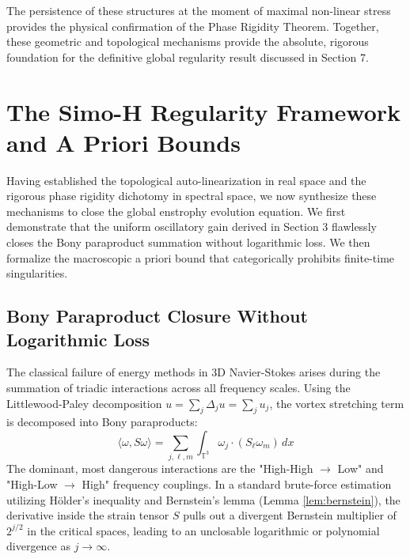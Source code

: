 \documentclass[12pt,a4paper]{article}
\theoremstyle{plain}
\theoremstyle{definition}
\theoremstyle{remark}
\begin{document}
The persistence of these structures at the moment of maximal non-linear stress provides the physical confirmation of the Phase Rigidity Theorem. Together, these geometric and topological mechanisms provide the absolute, rigorous foundation for the definitive global regularity result discussed in Section 7.

\section{The Simo-H Regularity Framework and A Priori Bounds}

Having established the topological auto-linearization in real space and the rigorous phase rigidity dichotomy in spectral space, we now synthesize these mechanisms to close the global enstrophy evolution equation. We first demonstrate that the uniform oscillatory gain derived in Section 3 flawlessly closes the Bony paraproduct summation without logarithmic loss. We then formalize the macroscopic a priori bound that categorically prohibits finite-time singularities.

\subsection{Bony Paraproduct Closure Without Logarithmic Loss}
The classical failure of energy methods in 3D Navier-Stokes arises during the summation of triadic interactions across all frequency scales. Using the Littlewood-Paley decomposition $u = \sum_j \Delta_j u = \sum_j u_j$, the vortex stretching term is decomposed into Bony paraproducts:
\begin{equation}
    \langle \omega, S\omega \rangle = \sum_{j, \ell, m} \int_{\mathbb{T}^3} \omega_j \cdot (S_\ell \omega_m) \, dx
\end{equation}
The dominant, most dangerous interactions are the "High-High $\to$ Low" and "High-Low $\to$ High" frequency couplings. In a standard brute-force estimation utilizing Hölder's inequality and Bernstein's lemma (Lemma \ref{lem:bernstein}), the derivative inside the strain tensor $S$ pulls out a divergent Bernstein multiplier of $2^{j/2}$ in the critical spaces, leading to an unclosable logarithmic or polynomial divergence as $j \to \infty$.
\end{document}
